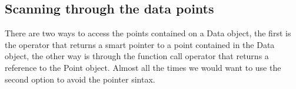 \documentclass[letterpaper,10pt,english]{sphinxmanual}
\begin{document}
\begin{sphinxVerbatim}[commandchars=\\\{\}]
    
      
      
      
      
\end{sphinxVerbatim}


\subsection{Scanning through the data points}
\label{\detokenize{getting_started/datamanagement:scanning-through-the-data-points}}\label{\detokenize{getting_started/datamanagement:scanningpoints}}
\sphinxAtStartPar
There are two ways to access the points contained on a Data object, the first is the operator \sphinxcode{\sphinxupquote{{[}{]}}} that returns a smart pointer to a point contained in the Data object, the other
way is through the function call operator \sphinxcode{\sphinxupquote{()}} that returns a reference to the Point object. Almost all the times we would want to use the second option to avoid the pointer sintax.
\end{document}
